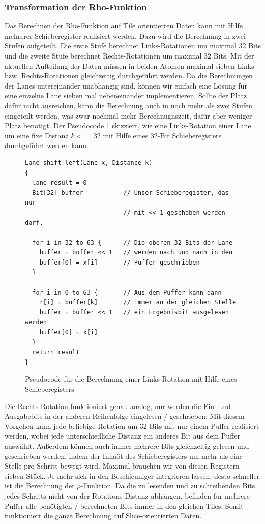 \subsubsection{Transformation der Rho-Funktion}
\label{cha:iteration_2_rho_transformation}
Das Berechnen der Rho-Funktion auf Tile orientierten Daten kann mit Hilfe mehrerer Schieberegister realisiert werden.
Dazu wird die Berechnung in zwei Stufen aufgeteilt. Die erste Stufe berechnet Links-Rotationen um maximal 32 Bits
und die zweite Stufe berechnet Rechts-Rotationen um maximal 32 Bits. Mit der aktuellen Aufteilung der Daten müssen in beiden Atomen
maximal sieben Links- bzw. Rechts-Rotationen gleichzeitig durchgeführt werden. Da die Berechnungen der Lanes untereinander unabhängig sind,
können wir einfach eine Lösung für eine einzelne Lane sieben mal nebeneinander implementieren. Sollte der Platz dafür nicht ausreichen,
kann die Berechnung auch in noch mehr als zwei Stufen eingeteilt werden, was zwar nochmal mehr Berechnugnszeit, dafür aber weniger Platz benötigt.
Der Pseudocode \ref{fig:iteration_2_leftshift} skizziert, wie eine Links-Rotation einer Lane um eine fixe Distanz $k <= 32$ mit Hilfe eines 32-Bit Schieberegisters
durchgeführt werden kann.
\begin{figure}
\lstset{language=C}
\begin{lstlisting}[label={lst:shift_left}]
Lane shift_left(Lane x, Distance k)
{
  lane result = 0
  Bit[32] buffer           // Unser Schieberegister, das nur
                           // mit << 1 geschoben werden darf.
  
  for i in 32 to 63 {      // Die oberen 32 Bits der Lane
    buffer = buffer << 1   // werden nach und nach in den
    buffer[0] = x[i]       // Puffer geschrieben
  }
  
  for i in 0 to 63 {       // Aus dem Puffer kann dann
    r[i] = buffer[k]       // immer an der gleichen Stelle
    buffer = buffer << 1   // ein Ergebnisbit ausgelesen werden
    buffer[0] = x[i]
  }
  return result
}
\end{lstlisting}
\caption{Pseudocode für die Berechnung einer Links-Rotation mit Hilfe eines Schieberegisters}
\label{fig:iteration_2_leftshift}
\end{figure}
Die Rechts-Rotation funktioniert genau analog, nur werden die Ein- und Ausgabebits in der anderen Reihenfolge eingelesen / geschrieben;
Mit diesem Vorgehen kann jede beliebige Rotation um 32 Bits mit nur einem Puffer realisiert werden, wobei jede unterschiedliche
Distanz ein anderes Bit aus dem Puffer auswählt. Außerdem können auch immer mehrere Bits gleichzeitig gelesen und geschrieben werden,
indem der Inhaöt des Schieberegisters um mehr als eine Stelle pro Schritt bewegt wird.
Maximal brauchen wir von diesen Registern sieben Stück. Je mehr sich in den Beschleuniger integrieren lassen,
desto schneller ist die Berechnung der $\rho$-Funktion. Da die zu lesenden und zu schreibenden Bits jedes Schritts nicht von der Rotations-Distanz
abhängen, befinden für mehrere Puffer alle benötigten / berechneten Bits immer in den gleichen Tiles.
Somit funktioniert die ganze Berechnung auf Slice-orientierten Daten.

